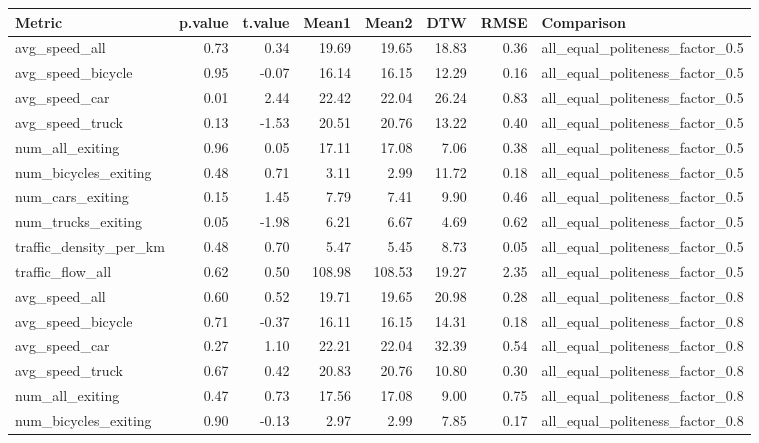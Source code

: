 \begin{table}[ht]
\centering
\begin{tabular}{lrrrrrrl}
  \hline
Metric & p.value & t.value & Mean1 & Mean2 & DTW & RMSE & Comparison \\ 
  \hline
avg\_speed\_all & 0.73 & 0.34 & 19.69 & 19.65 & 18.83 & 0.36 & all\_equal\_politeness\_factor\_0.5 \\ 
  avg\_speed\_bicycle & 0.95 & -0.07 & 16.14 & 16.15 & 12.29 & 0.16 & all\_equal\_politeness\_factor\_0.5 \\ 
  avg\_speed\_car & 0.01 & 2.44 & 22.42 & 22.04 & 26.24 & 0.83 & all\_equal\_politeness\_factor\_0.5 \\ 
  avg\_speed\_truck & 0.13 & -1.53 & 20.51 & 20.76 & 13.22 & 0.40 & all\_equal\_politeness\_factor\_0.5 \\ 
  num\_all\_exiting & 0.96 & 0.05 & 17.11 & 17.08 & 7.06 & 0.38 & all\_equal\_politeness\_factor\_0.5 \\ 
  num\_bicycles\_exiting & 0.48 & 0.71 & 3.11 & 2.99 & 11.72 & 0.18 & all\_equal\_politeness\_factor\_0.5 \\ 
  num\_cars\_exiting & 0.15 & 1.45 & 7.79 & 7.41 & 9.90 & 0.46 & all\_equal\_politeness\_factor\_0.5 \\ 
  num\_trucks\_exiting & 0.05 & -1.98 & 6.21 & 6.67 & 4.69 & 0.62 & all\_equal\_politeness\_factor\_0.5 \\ 
  traffic\_density\_per\_km & 0.48 & 0.70 & 5.47 & 5.45 & 8.73 & 0.05 & all\_equal\_politeness\_factor\_0.5 \\ 
  traffic\_flow\_all & 0.62 & 0.50 & 108.98 & 108.53 & 19.27 & 2.35 & all\_equal\_politeness\_factor\_0.5 \\ 
  avg\_speed\_all & 0.60 & 0.52 & 19.71 & 19.65 & 20.98 & 0.28 & all\_equal\_politeness\_factor\_0.8 \\ 
  avg\_speed\_bicycle & 0.71 & -0.37 & 16.11 & 16.15 & 14.31 & 0.18 & all\_equal\_politeness\_factor\_0.8 \\ 
  avg\_speed\_car & 0.27 & 1.10 & 22.21 & 22.04 & 32.39 & 0.54 & all\_equal\_politeness\_factor\_0.8 \\ 
  avg\_speed\_truck & 0.67 & 0.42 & 20.83 & 20.76 & 10.80 & 0.30 & all\_equal\_politeness\_factor\_0.8 \\ 
  num\_all\_exiting & 0.47 & 0.73 & 17.56 & 17.08 & 9.00 & 0.75 & all\_equal\_politeness\_factor\_0.8 \\ 
  num\_bicycles\_exiting & 0.90 & -0.13 & 2.97 & 2.99 & 7.85 & 0.17 & all\_equal\_politeness\_factor\_0.8 \\ 

\end{tabular}
\end{table}
